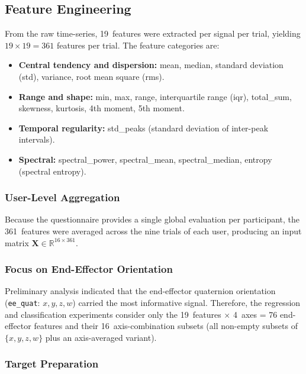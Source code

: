 \subsection{Feature Engineering}
\label{sec:features}

From the raw time-series, 19~features were extracted per signal per trial, yielding $19 \times 19 = 361$ features per trial. The feature categories are:

\begin{itemize}
\item \textbf{Central tendency and dispersion:} mean, median, standard
      deviation (std), variance, root mean square (rms).
\item \textbf{Range and shape:} min, max, range, interquartile range
      (iqr), total\_sum, skewness, kurtosis, 4th moment, 5th moment.
\item \textbf{Temporal regularity:} std\_peaks (standard deviation of
      inter-peak intervals).
\item \textbf{Spectral:} spectral\_power, spectral\_mean,
      spectral\_median, entropy (spectral entropy).
\end{itemize}

\subsubsection{User-Level Aggregation}

Because the questionnaire provides a single global evaluation per participant, the 361~features were averaged across the nine trials of each user, producing an input matrix $\mathbf{X} \in \mathbb{R}^{16 \times 361}$.

\subsubsection{Focus on End-Effector Orientation}

Preliminary analysis indicated that the end-effector quaternion orientation (\texttt{ee\_quat}: $x, y, z, w$) carried the most informative signal. Therefore, the regression and classification experiments consider only the 19~features $\times$ 4~axes = 76 end-effector features and their 16~axis-combination subsets (all non-empty subsets of $\{x,y,z,w\}$ plus an axis-averaged variant).

\subsubsection{Target Preparation}

